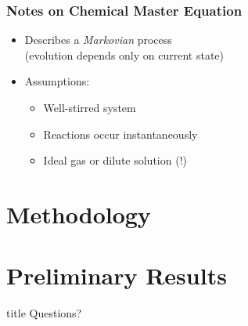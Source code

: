 \documentclass[xcolor={usenames,dvipsnames,svgnames}]{beamer}
\begin{document}
\begin{frame}
    \frametitle{Notes on Chemical Master Equation}
    \begin{itemize}
        \item Describes a \emph{Markovian} process\\
            (evolution depends only on current state)

        \item Assumptions:
        \begin{itemize}
            \item Well-stirred system
            \item Reactions occur instantaneously
            \item Ideal gas or dilute solution (!)
        \end{itemize}
    \end{itemize}
\end{frame}


\section{Methodology} %
\label{sec:methodology}


\section{Preliminary Results}

\begin{frame}[plain]

\hfill
    \begin{beamercolorbox}[rounded=true, center, shadow=true,wd=6cm]{title}
        \huge Questions?
    \end{beamercolorbox}
\hfill\hfill

\end{frame}
\end{document}
